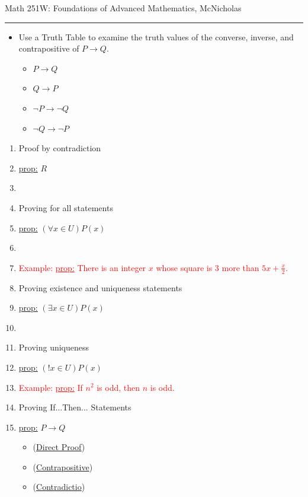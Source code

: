 \documentclass{article}
\begin{document}
	\newpage
	\hfill\small{Math 251W: Foundations of Advanced Mathematics, McNicholas}
	\vspace{0.5cm}
	\hrule
	\vspace{0.5cm}
	\large{
	\normalsize
	\begin{itemize}
		\item Use a Truth Table to examine the truth values of the converse, inverse, and contrapositive of $P\rightarrow Q.$
		\bigskip
		\begin{itemize}
			\item[]$P\rightarrow Q$
			\item[]$Q\rightarrow P$
			\item[]$\neg P\rightarrow \neg Q$
			\item[]$\neg Q\rightarrow \neg P$
		\end{itemize}


	\end{itemize}

	\newpage

	\large{
	\normalsize

	\begin{enumerate}
		\item Proof by contradiction
		\item []\underline{prop:} $R$
		\item[] 

		\vfill

		\item Proving for all statements
		\item[]\underline{prop:} $(\forall x\in U)P(x)$
		\item[] 
		\vfill

		\item[]\hfill \textcolor{Red}{Example: \underline{prop:} There is an integer $x$ whose square is $3$ more than $5x+\frac{x}{2}.$}
		\item Proving existence and uniqueness statements
		\item[]\underline{prop:} $(\exists x\in U)P(x)$
		\item[] 
		\vfill
		\vfill
		\item Proving uniqueness
		\item[]\underline{prop:} $(!x\in U)P(x)$
		\item[] 
		\vfill
		\vfill

		\newpage
		\normalsize \hfill \textcolor{Red}{Example: \underline{prop:} If $n^2$ is odd, then $n$ is odd.}
		\item Proving If...Then... Statements
		\item[]\underline{prop:} $P\rightarrow Q$
		\begin{itemize}
			\item {}(\underline{Direct Proof})
			\vfill
			\item {}(\underline{Contrapositive})
			\vfill
			\item {}(\underline{Contradictio})
			\vfill


\end{itemize}
\end{enumerate}}}
\end{document}
